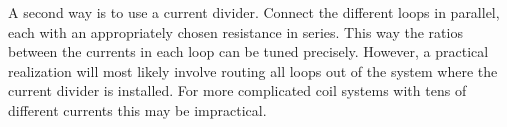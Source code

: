 A second way is to use a current divider. Connect the different loops in parallel, each with an appropriately chosen resistance in series. This way the ratios between the currents in each loop can be tuned precisely. However, a practical realization will most likely involve routing all loops out of the system where the current divider is installed. For more complicated coil systems with tens of different currents this may be impractical.



